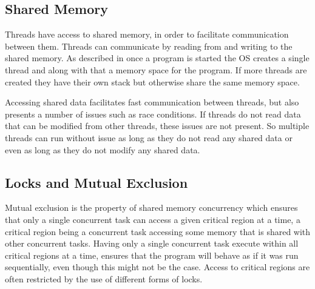 \subsection{Shared Memory}\label{sub:sec:shared_memory}
Threads have access to shared memory, in order to facilitate communication between them\cite[p. 93]{tanenbaum2008modern}. Threads can communicate by reading from and writing to the shared memory. As described in  once a program is started the \ac{OS} creates a single thread and along with that a memory space for the program. If more threads are created they have their own stack but otherwise share the same memory space.

Accessing shared data facilitates fast communication between threads, but also presents a number of issues such as race conditions. If threads do not read data that can be modified from other threads, these issues are not present. So multiple threads can run without issue as long as they do not read any shared data or even as long as they do not modify any shared data.


\subsection{Locks and Mutual Exclusion}\label{sec:locks_me}
Mutual exclusion is the property of shared memory concurrency which ensures that only a single concurrent task can access a given critical region at a time\cite[p. 117]{tanenbaum2008modern}\cite[p. 962]{bryant2011computer}, a critical region being a concurrent task accessing some memory that is shared with other concurrent tasks\cite[p. 117]{tanenbaum2008modern}\cite[p. 961]{bryant2011computer}. Having only a single concurrent task execute within all critical regions at a time, ensures that the program will behave as if it was run sequentially, even though this might not be the case. Access to critical regions are often restricted by the use of different forms of locks\cite[p. 58]{sutter2005software}. 

